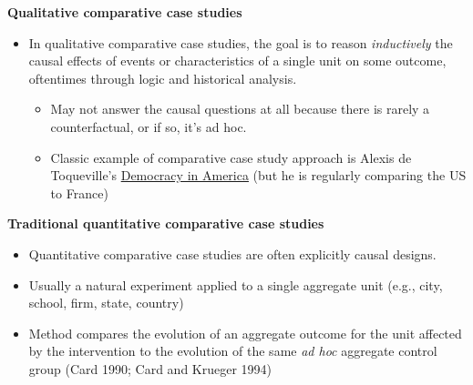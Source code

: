 \documentclass[notes=show]{beamer}
\begin{document}
\begin{frame}[plain]
	\begin{center}
	\textbf{Qualitative comparative case studies}
	\end{center}
	
	\begin{itemize}
	\item In qualitative comparative case studies, the goal is to reason \emph{inductively} the causal effects of events or characteristics of a single unit on some outcome, oftentimes through logic and historical analysis.  
		\begin{itemize}
		\item May not answer the causal questions at all because there is rarely a counterfactual, or if so, it's ad hoc.
		\item Classic example of comparative case study approach is Alexis de Toqueville's \underline{Democracy in America} (but he is regularly comparing the US to France)
		\end{itemize}
	\end{itemize}
\end{frame}

\begin{frame}[plain]
\begin{center}
\textbf{Traditional quantitative comparative case studies}
\end{center}

\begin{itemize}
	\item Quantitative comparative case studies are often explicitly causal designs.  
	\item Usually a natural experiment applied to a single aggregate unit (e.g., city, school, firm, state, country)
	\item Method compares the evolution of an aggregate outcome for the unit affected by the intervention to the evolution of the same \emph{ad hoc} aggregate control group (Card 1990; Card and Krueger 1994)
\end{itemize}

\end{frame}
\end{document}
